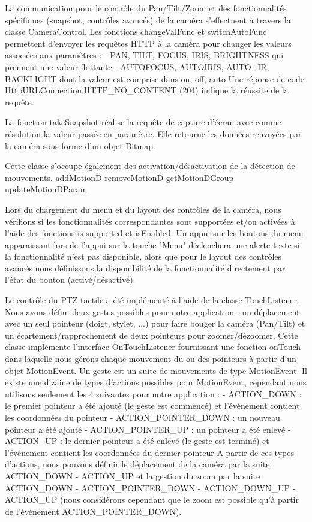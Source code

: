 La communication pour le contrôle du Pan/Tilt/Zoom et des fonctionnalités spécifiques (snapshot, contrôles avancés) de la caméra s'effectuent à travers la classe CameraControl.
Les fonctions changeValFunc et switchAutoFunc permettent d'envoyer les requêtes HTTP à la caméra pour changer les valeurs associées aux paramètres :
- PAN, TILT, FOCUS, IRIS, BRIGHTNESS qui prennent une valeur flottante
- AUTOFOCUS, AUTOIRIS, AUTO_IR, BACKLIGHT dont la valeur est comprise dans { on, off, auto }
Une réponse de code HttpURLConnection.HTTP_NO_CONTENT (204) indique la réussite de la requête.

La fonction takeSnapshot réalise la requête de capture d'écran avec comme résolution la valeur passée en paramètre.
Elle retourne les données renvoyées par la caméra sous forme d'un objet Bitmap.

Cette classe s'occupe également des activation/désactivation de la détection de mouvements.
addMotionD
removeMotionD
getMotionDGroup
updateMotionDParam


Lors du chargement du menu et du layout des contrôles de la caméra, nous vérifions si les fonctionnalités correspondantes sont supportées et/ou activées à l'aide des fonctions
is supported et isEnabled. Un appui sur les boutons du menu apparaissant lors de l'appui sur la touche "Menu" déclenchera une alerte texte si la fonctionnalité n'est pas
disponible, alors que pour le layout des contrôles avancés nous définissons la disponibilité de la fonctionnalité directement par l'état du bouton (activé/désactivé).

Le contrôle du PTZ tactile a été implémenté à l'aide de la classe TouchListener. Nous avons défini deux gestes possibles pour notre application : un déplacement avec un seul pointeur
(doigt, stylet, ...) pour faire bouger la caméra (Pan/Tilt) et un écartement/rapprochement de deux pointeurs pour zoomer/dézoomer. Cette classe implémente l'interface OnTouchListener
fournissant une fonction onTouch dans laquelle nous gérons chaque mouvement du ou des pointeurs à partir d'un objet MotionEvent. Un geste est un suite de mouvements de type MotionEvent.
Il existe une dizaine de types d'actions possibles pour MotionEvent, cependant nous utilisons seulement les 4 suivantes pour notre application :
- ACTION_DOWN : le premier pointeur a été ajouté (le geste est commencé) et l'événement contient les coordonnées du pointeur
- ACTION_POINTER_DOWN : un nouveau pointeur a été ajouté
- ACTION_POINTER_UP : un pointeur a été enlevé
- ACTION_UP : le dernier pointeur a été enlevé (le geste est terminé) et l'événement contient les coordonnées du dernier pointeur
A partir de ces types d'actions, nous pouvons définir le déplacement de la caméra par la suite ACTION_DOWN - ACTION_UP et la gestion du zoom par la suite
ACTION_DOWN - ACTION_POINTER_DOWN - ACTION_DOWN_UP - ACTION_UP (nous considérons cependant que le zoom est possible qu'à partir de l'événement ACTION_POINTER_DOWN).

